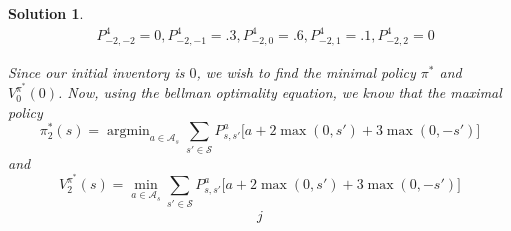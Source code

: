\documentclass[12pt]{amsart}
\newtheorem{sol}[thm]{Solution}
\newcommand{\MA}{\mathcal{A}}
\newcommand{\MS}{\mathcal{S}}
\DeclareMathOperator*{\argmin}{argmin}
\begin{document}
\begin{sol}
\begin{align*}
&P^4_{-2,-2} = 0, P^4_{-2,-1} = .3, P^4_{-2,0} = .6, P^4_{-2,1} = .1, P^4_{-2,2} = 0 
\end{align*}

Since our initial inventory is $0$, we wish to find the minimal policy $\pi^*$ and $V^{\pi^*}_0(0)$. Now, using the bellman optimality equation, we know that the maximal policy $$\pi^*_2(s) = \argmin_{a \in \MA_s} \sum_{s' \in \MS} P^a_{s,s'} \bigg[ a + 2\max(0, s')+3\max(0,-s')\bigg]$$ and $$ V^{\pi^*}_{2}(s) = \min_{a \in \MA_s} \sum_{s' \in \MS} P^a_{s,s'} \bigg[ a + 2\max(0, s')+3\max(0,-s')\bigg]$$
\begin{align*}
j
\end{align*}
\end{sol}
\end{document}

